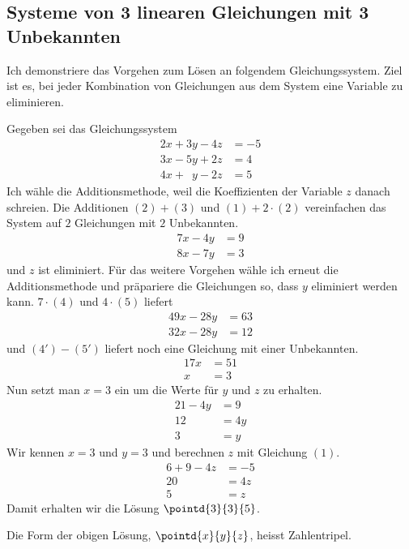 \documentclass[%
11pt,%
twoside,%
titlepage,%
german,%
headsepline%
]{scrartcl}
\begin{document}
\subsection{Systeme von 3 linearen Gleichungen mit 3 Unbekannten}
Ich demonstriere das Vorgehen zum L\"osen an folgendem Gleichungssystem. Ziel ist es, bei jeder Kombination von Gleichungen aus dem System eine Variable zu eliminieren.
\begin{bsp}
Gegeben sei das Gleichungssystem
\begin{align}
2x+3y-4z&=-5\tag{1}\\
3x-5y+2z&=4\tag{2}\\
4x+\phantom{1}y-2z&=5\tag{3}
\end{align}
Ich w\"ahle die Additionsmethode, weil die Koeffizienten der Variable $z$ danach schreien. Die Additionen $(2)+(3)$ und $(1)+2\cdot(2)$ vereinfachen das System auf $2$ Gleichungen mit $2$ Unbekannten.
\begin{align}
7x-4y&=9\tag{4}\\
8x-7y&=3\tag{5}
\end{align}
und $z$ ist eliminiert. F\"ur das weitere Vorgehen w\"ahle ich erneut die Additionsmethode und pr\"apariere die Gleichungen so, dass $y$ eliminiert werden kann. $7\cdot(4)$ und $4\cdot(5)$ liefert
\begin{align}
49x-28y&=63\tag{4'}\\
32x-28y&=12\tag{5'}
\end{align}
und $(4')-(5')$ liefert noch eine Gleichung mit einer Unbekannten.
\begin{align}
17x&=51\tag*{$\div17$}\\
x&=3\tag{6}
\end{align}
Nun setzt man $x=3$ ein um die Werte f\"ur $y$ und $z$ zu erhalten.
\begin{align}
21-4y&=9\tag{6) in (4}\\
12&=4y\tag*{$\div4$}\\
3&=y\tag{7}
\end{align}
Wir kennen $x=3$ und $y=3$ und berechnen $z$ mit Gleichung $(1)$.
\begin{align}
6+9-4z&=-5\tag{6) und (7) in (1}\\
20&=4z\tag*{$\div4$}\\
5&=z\tag{8}
\end{align}
Damit erhalten wir die L\"osung $\pointd{3}{3}{5}$.
\end{bsp}
\begin{bem}
Die Form der obigen L\"osung, $\pointd{x}{y}{z}$, heisst Zahlentripel.
\end{bem}
\end{document}
